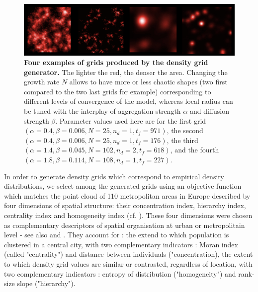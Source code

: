\documentclass{JASSS}
\begin{document}
\begin{figure}[!t]
\centering
	\includegraphics[width=\textwidth]{figures/Fig2.png}
 \caption{\textbf{Four examples of grids produced by the density grid generator.} The lighter the red, the denser the area. Changing the growth rate $N$ allows to have more or less chaotic shapes (two first compared to the two last grids for example) corresponding to different levels of convergence of the model, whereas local radius can be tuned with the interplay of aggregation strength $\alpha$ and diffusion strength $\beta$. Parameter values used here are for the first grid $(\alpha = 0.4,\beta=0.006, N = 25, n_d = 1, t_f = 971)$, the second $(\alpha = 0.4,\beta=0.006, N = 25, n_d = 1, t_f = 176)$, the third $(\alpha = 1.4,\beta=0.045, N = 102, n_d = 2, t_f = 618)$, and the fourth $(\alpha = 1.8,\beta=0.114, N = 108, n_d = 1, t_f = 227)$.}
\label{fig:spatialGen}
\end{figure} %


In order to generate density grids which correspond to empirical density distributions, we select among the generated grids using an objective function which matches the point cloud of 110 metropolitan areas in Europe described by four dimensions of spatial structure: their concentration index, hierarchy index, centrality index and homogeneity index (cf. \cite{LeNechet2015}). These four dimensions were chosen as complementary descriptors of spatial organisation at urban or metropolitain level - see also \cite{tsai2005quantifying} and \cite{schwarz2010urban}. They account for : the extend to which population is clustered in a central city, with two complementary indicators : Moran index (called "centrality") and distance between individuals ("concentration), the extent to which density grid values are similar or contrasted, regardless of location, with two complementary indicators : entropy of distribution ("homogeneity") and rank-size slope ("hierarchy").
\end{document}
